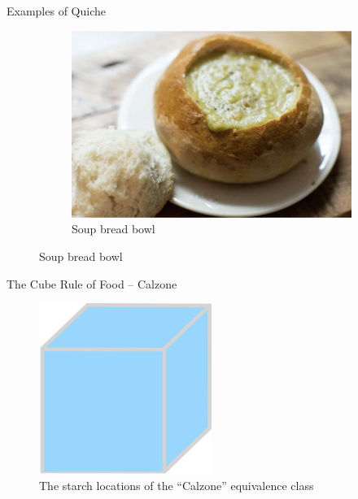\documentclass{beamer}
\begin{document}
\begin{frame}{Examples of Quiche}
\begin{figure}
        \begin{subfigure}{.4\textwidth}
          \centering
          \includegraphics[width=.8\linewidth]{images/cube_rule_of_food/quiche/24_soup_bread_bowl.jpg}
          \caption{\label{fig:soup-bread-bowl}Soup bread bowl}
        \end{subfigure}
    \end{figure}
\end{frame}

\begin{frame}{The Cube Rule of Food -- Calzone}
    \begin{figure}
        \includegraphics[width=0.5\textwidth]{images/cube_rule_of_food/calzone/26_calzone.jpg}
        \caption{\label{fig:calzone-diagram}The starch locations of the ``Calzone'' equivalence class}
    \end{figure}
\end{frame}
\end{document}
